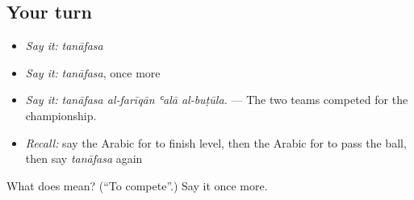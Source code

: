 \subsection*{Your turn}
\begin{itemize}
\raggedright
  \item \emph{Say it:} \emph{tanāfasa}
  \item \emph{Say it:} \emph{tanāfasa}, once more
  \item \emph{Say it:} \emph{tanāfasa al-farīqān ʿalā al-buṭūla.} — The two teams competed for the championship.
  \item \emph{Recall:} say the Arabic for to finish level, then the Arabic for to pass the ball, then say \emph{tanāfasa} again
\end{itemize}

\begin{tcolorbox}[breakable,colback=teal!4,colframe=teal!35!black,title={Before you move on}]
What does  mean? (\textquotedblleft{}To compete\textquotedblright{}.) Say it once more.
\end{tcolorbox}

